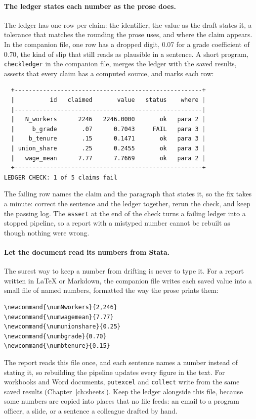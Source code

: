 \paragraph{The ledger states each number as the prose does.} The ledger has one row per claim: the identifier, the value as the draft states it, a tolerance that matches the rounding the prose uses, and where the claim appears. In the companion file, one row has a dropped digit, 0.07 for a grade coefficient of 0.70, the kind of slip that still reads as plausible in a sentence. A short program, \texttt{checkledger} in the companion file, merges the ledger with the saved results, asserts that every claim has a computed source, and marks each row:
\par
{\footnotesize
\begin{verbatim}
  +-----------------------------------------------------+
  |          id   claimed       value   status    where |
  |-----------------------------------------------------|
  |   N_workers      2246   2246.0000       ok   para 2 |
  |     b_grade       .07      0.7043     FAIL   para 3 |
  |    b_tenure       .15      0.1471       ok   para 3 |
  | union_share       .25      0.2455       ok   para 3 |
  |   wage_mean      7.77      7.7669       ok   para 2 |
  +-----------------------------------------------------+
LEDGER CHECK: 1 of 5 claims fail
\end{verbatim}
}
The failing row names the claim and the paragraph that states it, so the fix takes a minute: correct the sentence and the ledger together, rerun the check, and keep the passing log. The \texttt{assert} at the end of the check turns a failing ledger into a stopped pipeline, so a report with a mistyped number cannot be rebuilt as though nothing were wrong.

\paragraph{Let the document read its numbers from Stata.} The surest way to keep a number from drifting is never to type it. For a report written in LaTeX or Markdown, the companion file writes each saved value into a small file of named numbers, formatted the way the prose prints them:
\par
{\footnotesize
\begin{verbatim}
\newcommand{\numNworkers}{2,246}
\newcommand{\numwagemean}{7.77}
\newcommand{\numunionshare}{0.25}
\newcommand{\numbgrade}{0.70}
\newcommand{\numbtenure}{0.15}
\end{verbatim}
}
The report reads this file once, and each sentence names a number instead of stating it, so rebuilding the pipeline updates every figure in the text. For workbooks and Word documents, \texttt{putexcel} and \texttt{collect} write from the same saved results (Chapter~\ref{ch:sheets}). Keep the ledger alongside this file, because some numbers are copied into places that no file feeds: an email to a program officer, a slide, or a sentence a colleague drafted by hand.


